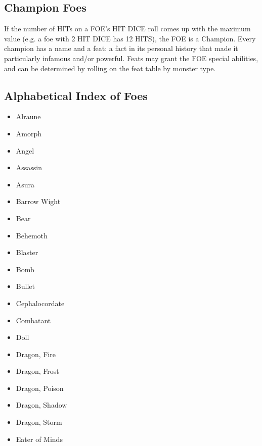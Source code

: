 \subsection{Champion Foes}
If the number of HITs on a FOE's HIT DICE roll comes up with the maximum value (e.g. a foe with 2 HIT DICE has 12 HITS), the FOE is a Champion. Every champion has a name and a feat: a fact in its personal history that made it particularly infamous and/or powerful. Feats may grant the FOE special abilities, and can be determined by rolling on the feat table by monster type.

\subsection{Alphabetical Index of Foes}
\begin{multicols}{3}
    \begin{itemize}
        \item Alraune \pageref{foe:alraune}
        \item Amorph \pageref{foe:amorph}
        \item Angel \pageref{foe:angel}
        \item Assassin \pageref{foe:assassin}
        \item Asura \pageref{foe:asura}
        \item Barrow Wight \pageref{foe:barrow-wight}
        \item Bear \pageref{foe:bear}
        \item Behemoth \pageref{foe:behemoth}
        \item Blaster \pageref{foe:blaster}
        \item Bomb \pageref{foe:bomb}
        \item Bullet \pageref{foe:bullet}
        \item Cephalocordate \pageref{foe:cephalocordate}
        \item Combatant \pageref{foe:combatant}
        \item Doll \pageref{foe:doll}
        \item Dragon, Fire \pageref{foe:dragon-fire}
        \item Dragon, Frost \pageref{foe:dragon-frost}
        \item Dragon, Poison \pageref{foe:dragon-poison}
        \item Dragon, Shadow \pageref{foe:dragon-shadow}
        \item Dragon, Storm \pageref{foe:dragon-storm}
        \item Eater of Minds \pageref{foe:eater-of-minds}

\end{itemize}
\end{multicols}
